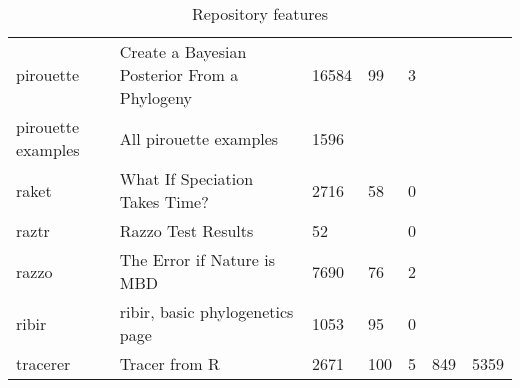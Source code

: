 \begin{table}[ht]
\begin{tabular}{p{}p{}p{}p{}p{}p{}p{}}
  pirouette & Create a Bayesian Posterior From a Phylogeny & 16584 &  99 &   3 &  &  \\ 
  pirouette examples & All pirouette examples & 1596 &  &  &  &  \\ 
  raket & What If Speciation Takes Time? & 2716 &  58 &   0 &  &  \\ 
  raztr & Razzo Test Results &  52 &  &   0 &  &  \\ 
  razzo & The Error if Nature is MBD & 7690 &  76 &   2 &  &  \\ 
  ribir & ribir, basic phylogenetics page & 1053 &  95 &   0 &  &  \\ 
  tracerer & Tracer from R & 2671 & 100 &   5 & 849 & 5359 \\ 
   \hline
\end{tabular}
\caption{Repository features} 
\label{tab:repos}
\end{table}
